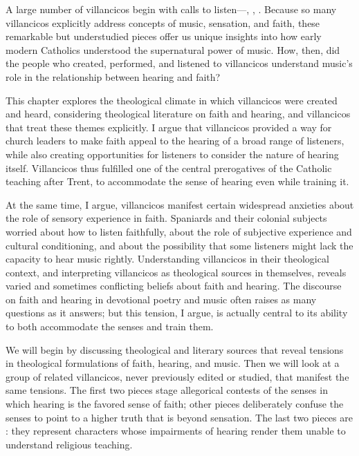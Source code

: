 A large number of villancicos begin with calls to listen---, 
, .
Because so many villancicos explicitly address concepts of music, sensation, 
and faith, these remarkable but understudied pieces offer us unique insights 
into how early modern Catholics understood the supernatural power of music.
How, then, did the people who created, performed, and listened to villancicos 
understand music's role in the relationship between hearing and faith?

This chapter explores the theological climate in which villancicos were created 
and heard, considering theological literature on faith and hearing, and 
villancicos that treat these themes explicitly.
I argue that villancicos provided a way for church leaders to make faith appeal 
to the hearing of a broad range of listeners, while also creating opportunities 
for listeners to consider the nature of hearing itself.
Villancicos thus fulfilled one of the central prerogatives of the Catholic 
teaching after Trent, to accommodate the sense of hearing even while training 
it.

At the same time, I argue, villancicos manifest certain widespread anxieties 
about the role of sensory experience in faith. 
Spaniards and their colonial subjects worried about how to listen faithfully, 
about the role of subjective experience and cultural conditioning, and about 
the possibility that some listeners might lack the capacity to hear music 
rightly.
Understanding villancicos in their theological context, and interpreting 
villancicos as theological sources in themselves, reveals varied and sometimes 
conflicting beliefs about faith and hearing.
The discourse on faith and hearing in devotional poetry and music often raises 
as many questions as it answers; but this tension, I argue, is actually central 
to its ability to both accommodate the senses and train them.

We will begin by discussing theological and literary sources that reveal 
tensions in theological formulations of faith, hearing, and music.
Then we will look at a group of related villancicos, never previously edited or 
studied, that manifest the same tensions.
The first two pieces stage allegorical contests of the senses in which hearing 
is the favored sense of faith; other pieces deliberately confuse the senses to 
point to a higher truth that is beyond sensation.
The last two pieces are : they represent 
characters whose impairments of hearing render them unable to understand 
religious teaching.

